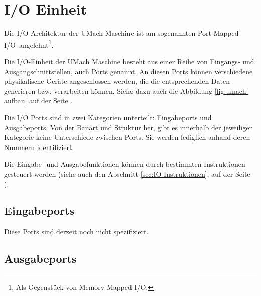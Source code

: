 \section{I/O Einheit}
\label{sec:IO-Einheit}

Die I/O-Architektur der UMach Maschine ist am sogenannten \glqq Port-Mapped
I/O\grqq\ angelehnt\footnote{Als Gegenstück von \glqq Memory Mapped I/O\grqq.}.


Die I/O-Einheit der UMach Maschine besteht aus einer Reihe von Eingangs- und
Ausgangschnittstellen, auch Ports genannt. An
diesen Ports können verschiedene physikalische Geräte angeschlossen werden, die
die entsprechenden Daten generieren bzw. verarbeiten können. Siehe dazu auch die
Abbildung \ref{fig:umach-aufbau} auf der Seite \pageref{fig:umach-aufbau}.

Die I/O Ports sind in zwei Kategorien unterteilt: Eingabeports und
Ausgabeports. Von der Bauart und Struktur her, gibt es innerhalb der jeweiligen
Kategorie keine Unterschiede zwischen Ports. Sie werden lediglich anhand deren
Nummern identifiziert.

Die Eingabe- und Ausgabefunktionen können durch bestimmten Instruktionen
gesteuert werden (siehe auch den Abschnitt \ref{sec:IO-Instruktionen}, auf der
Seite \pageref{sec:IO-Instruktionen}).


\subsection{Eingabeports}

Diese Ports sind derzeit noch nicht spezifiziert.



\subsection{Ausgabeports}

